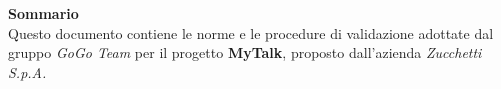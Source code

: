 \begin{center}
	\Large{\textbf{Sommario}}\\

	\normalsize
		Questo documento contiene le norme e le procedure di validazione adottate dal gruppo \textit{GoGo Team} per il progetto \textbf{MyTalk}, 
		proposto dall’azienda \textit{Zucchetti S.p.A.}
\end{center}